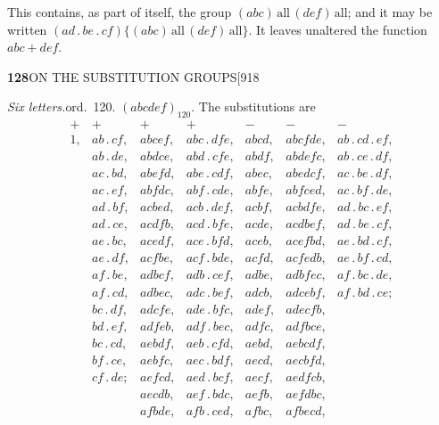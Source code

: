 \documentclass[11pt]{article}
\begin{document}
\hspace{1em} This contains, as part of itself, the group
$(abc)\,\text{all}\,(def)\,\text{all}$; and it may be written
$(ad\,.\,be\,.\,cf)\{(abc)\,\text{all}\,(def)\,\text{all}\}$. It leaves
unaltered the function $abc+def$.

\newpage
\noindent\textbf{128}\hfill ON THE SUBSTITUTION GROUPS\hfill[918

\smallskip
\noindent\textit{Six letters.}\hspace{2em}ord.\ 120. $(abcdef)_{120}$. The
substitutions are
\[
\begin{array}{lllllll}
+ & + & + & + & - & - & -\\
1, & ab\,.\,cf, & abcef, & abc\,.\,dfe, & abcd, & abcfde, & ab\,.\,cd\,.\,ef,\\
   & ab\,.\,de, & abdce, & abd\,.\,cfe, & abdf, & abdefc, & ab\,.\,ce\,.\,df,\\
   & ac\,.\,bd, & abefd, & abe\,.\,cdf, & abec, & abedcf, & ac\,.\,be\,.\,df,\\
   & ac\,.\,ef, & abfdc, & abf\,.\,cde, & abfe, & abfced, & ac\,.\,bf\,.\,de,\\
   & ad\,.\,bf, & acbed, & acb\,.\,def, & acbf, & acbdfe, & ad\,.\,bc\,.\,ef,\\
   & ad\,.\,ce, & acdfb, & acd\,.\,bfe, & acde, & acdbef, & ad\,.\,be\,.\,cf,\\
   & ae\,.\,bc, & acedf, & ace\,.\,bfd, & aceb, & acefbd, & ae\,.\,bd\,.\,cf,\\
   & ae\,.\,df, & acfbe, & acf\,.\,bde, & acfd, & acfedb, & ae\,.\,bf\,.\,cd,\\
   & af\,.\,be, & adbcf, & adb\,.\,cef, & adbe, & adbfec, & af\,.\,bc\,.\,de,\\
   & af\,.\,cd, & adbec, & adc\,.\,bef, & adcb, & adcebf, & af\,.\,bd\,.\,ce;\\
   & bc\,.\,df, & adcfe, & ade\,.\,bfc, & adef, & adecfb, & \\
   & bd\,.\,ef, & adfeb, & adf\,.\,bec, & adfc, & adfbce, & \\
   & bc\,.\,cd, & aebdf, & aeb\,.\,cfd, & aebd, & aebcdf, & \\
   & bf\,.\,ce, & aebfc, & aec\,.\,bdf, & aecd, & aecbfd, & \\
   & cf\,.\,de; & aefcd, & aed\,.\,bcf, & aecf, & aedfcb, & \\
   &            & aecdb, & aef\,.\,bdc, & aefb, & aefdbc, & \\
   &            & afbde, & afb\,.\,ced, & afbc, & afbecd, & \\

\end{array}\]
\end{document}
